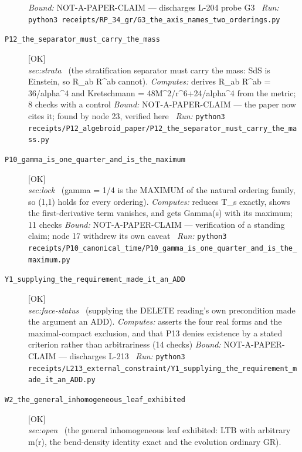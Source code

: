 \begin{description}
 \emph{Bound:} NOT-A-PAPER-CLAIM --- discharges L-204 probe G3
\ \emph{Run:} \texttt{python3 receipts/RP\_34\_gr/G3\_the\_axis\_names\_two\_orderings.py}
\item[\label{rcpt:P12_the_separator_must_carry_the_mass}\texttt{P12\_the\_separator\_must\_carry\_the\_mass}]\hfill\textsf{[OK]}\\
\textit{sec:strata} \ (the stratification separator must carry the mass: SdS is Einstein, so R\_ab R\textasciicircum{}ab cannot). 
\emph{Computes:} derives R\_ab R\textasciicircum{}ab = 36/alpha\textasciicircum{}4 and Kretschmann = 48M\textasciicircum{}2/r\textasciicircum{}6+24/alpha\textasciicircum{}4 from the metric; 8 checks with a control
 \emph{Bound:} NOT-A-PAPER-CLAIM --- the paper now cites it; found by node 23, verified here
\ \emph{Run:} \texttt{python3 receipts/P12\_algebroid\_paper/P12\_the\_separator\_must\_carry\_the\_mass.py}
\item[\label{rcpt:P10_gamma_is_one_quarter_and_is_the_maximum}\texttt{P10\_gamma\_is\_one\_quarter\_and\_is\_the\_maximum}]\hfill\textsf{[OK]}\\
\textit{sec:lock} \ (gamma = 1/4 is the MAXIMUM of the natural ordering family, so (1,1) holds for every ordering). 
\emph{Computes:} reduces T\_s exactly, shows the first-derivative term vanishes, and gets Gamma(s) with its maximum; 11 checks
 \emph{Bound:} NOT-A-PAPER-CLAIM --- verification of a standing claim; node 17 withdrew its own caveat
\ \emph{Run:} \texttt{python3 receipts/P10\_canonical\_time/P10\_gamma\_is\_one\_quarter\_and\_is\_the\_maximum.py}
\item[\label{rcpt:Y1_supplying_the_requirement_made_it_an_ADD}\texttt{Y1\_supplying\_the\_requirement\_made\_it\_an\_ADD}]\hfill\textsf{[OK]}\\
\textit{sec:face-status} \ (supplying the DELETE reading's own precondition made the argument an ADD). 
\emph{Computes:} asserts the four real forms and the maximal-compact exclusion, and that P13 denies existence by a stated criterion rather than arbitrariness (14 checks)
 \emph{Bound:} NOT-A-PAPER-CLAIM --- discharges L-213
\ \emph{Run:} \texttt{python3 receipts/L213\_external\_constraint/Y1\_supplying\_the\_requirement\_made\_it\_an\_ADD.py}
\item[\label{rcpt:W2_the_general_inhomogeneous_leaf_exhibited}\texttt{W2\_the\_general\_inhomogeneous\_leaf\_exhibited}]\hfill\textsf{[OK]}\\
\textit{sec:open} \ (the general inhomogeneous leaf exhibited: LTB with arbitrary m(r), the bend-density identity exact and the evolution ordinary GR). 

\end{description}
